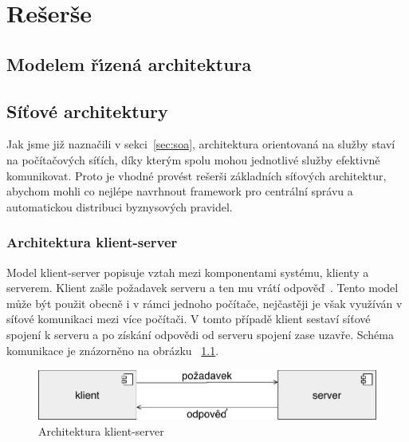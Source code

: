 
\chapter{Rešerše}\label{ch:reserse}

\section{Modelem ř\'{\i}zená architektura}


\section{Síťové architektury}

Jak jsme již naznačili v sekci~\ref{sec:soa}, architektura orientovaná na služby staví
na počítačových síťích, díky kterým spolu mohou jednotlivé služby efektivně komunikovat.
Proto je vhodné provést rešerši základních síťových architektur,
abychom mohli co nejlépe navrhnout framework pro centrální správu
a automatickou distribuci byznysových pravidel.

\subsection{Architektura klient-server}\label{sec:client-server}

Model klient-server popisuje vztah mezi komponentami systému, klienty a serverem.
Klient zašle požadavek serveru a ten mu vrátí odpověď~\cite{berson1992client}.
Tento model může být použit obecně i v rámci jednoho počítače,
nejčastěji je však využíván v síťové komunikaci mezi více počítači.
V tomto případě klient sestaví síťové spojení k serveru a po získání odpovědi
od serveru spojení zase uzavře. Schéma komunikace je znázorněno
na obrázku ~\ref{fig:client-server}.

\begin{figure}[t]
    \centering
    \includegraphics[keepaspectratio=true, width=0.6\linewidth]{figures/client-server.pdf}
    \caption{Architektura klient-server}
    \label{fig:client-server}
\end{figure}

